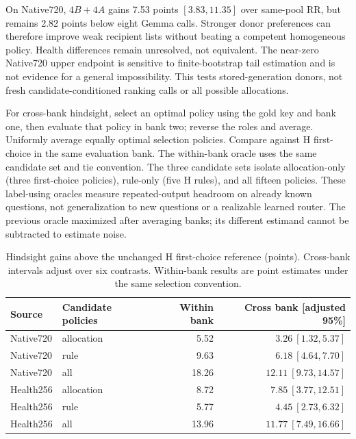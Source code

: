 On Native720, $4B+4A$ gains 7.53 points $[3.83,11.35]$ over same-pool RR, but remains 2.82 points below eight Gemma calls. Stronger donor preferences can therefore improve weak recipient lists without beating a competent homogeneous policy. Health differences remain unresolved, not equivalent. The near-zero Native720 upper endpoint is sensitive to finite-bootstrap tail estimation and is not evidence for a general impossibility. This tests stored-generation donors, not fresh candidate-conditioned ranking calls or all possible allocations.

For cross-bank hindsight, select an optimal policy using the gold key and bank one, then evaluate that policy in bank two; reverse the roles and average. Uniformly average equally optimal selection policies. Compare against H first-choice in the same evaluation bank. The within-bank oracle uses the same candidate set and tie convention. The three candidate sets isolate allocation-only (three first-choice policies), rule-only (five H rules), and all fifteen policies. These label-using oracles measure repeated-output headroom on already known questions, not generalization to new questions or a realizable learned router. The previous oracle maximized after averaging banks; its different estimand cannot be subtracted to estimate noise.

\begin{table}[ht]
\centering\small
\caption{Hindsight gains above the unchanged H first-choice reference (points). Cross-bank intervals adjust over six contrasts. Within-bank results are point estimates under the same selection convention.}
\begin{tabular}{llrr}
\toprule
Source & Candidate policies & Within bank & Cross bank [adjusted 95\%]\\
\midrule
Native720 & allocation & 5.52 & $3.26\ [1.32,5.37]$\\
Native720 & rule & 9.63 & $6.18\ [4.64,7.70]$\\
Native720 & all & 18.26 & $12.11\ [9.73,14.57]$\\
Health256 & allocation & 8.72 & $7.85\ [3.77,12.51]$\\
Health256 & rule & 5.77 & $4.45\ [2.73,6.32]$\\
Health256 & all & 13.96 & $11.77\ [7.49,16.66]$\\
\bottomrule
\end{tabular}
\end{table}

